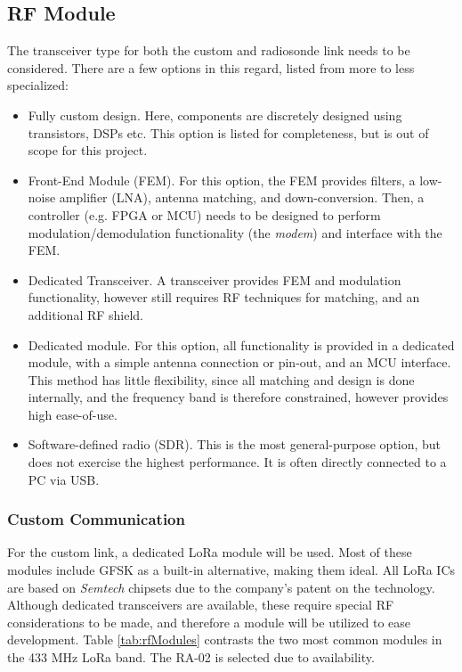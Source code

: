 \subsection{RF Module}
The transceiver type for both the custom and radiosonde link needs to be considered. There are a few options in this regard, listed from more to less specialized:
\begin{itemize}
    \item Fully custom design. Here, components are discretely designed using transistors, DSPs etc. This option is listed for completeness, but is out of scope for this project.
    \item Front-End Module (FEM). For this option, the FEM provides filters, a low-noise amplifier (LNA), antenna matching, and down-conversion. Then, a controller (e.g. FPGA or MCU) needs to be designed to perform modulation/demodulation functionality (the \textit{modem}) and interface with the FEM.
    \item Dedicated Transceiver. A transceiver provides FEM and modulation functionality, however still requires RF techniques for matching, and an additional RF shield.
    \item Dedicated module. For this option, all functionality is provided in a dedicated module, with a simple antenna connection or pin-out, and an MCU interface. This method has little flexibility, since all matching and design is done internally, and the frequency band is therefore constrained, however provides high ease-of-use.
    \item Software-defined radio (SDR). This is the most general-purpose option, but does not exercise the highest performance. It is often directly connected to a PC via USB.
\end{itemize}

\subsubsection{Custom Communication}
For the custom link, a dedicated LoRa module will be used. Most of these modules include GFSK as a built-in alternative, making them ideal. All LoRa ICs are based on \textit{Semtech} chipsets due to the company's patent on the technology. Although dedicated transceivers are available, these require special RF considerations to be made, and therefore a module will be utilized to ease development. Table \ref{tab:rfModules} contrasts the two most common modules in the 433 MHz LoRa band. The RA-02 is selected due to availability.

